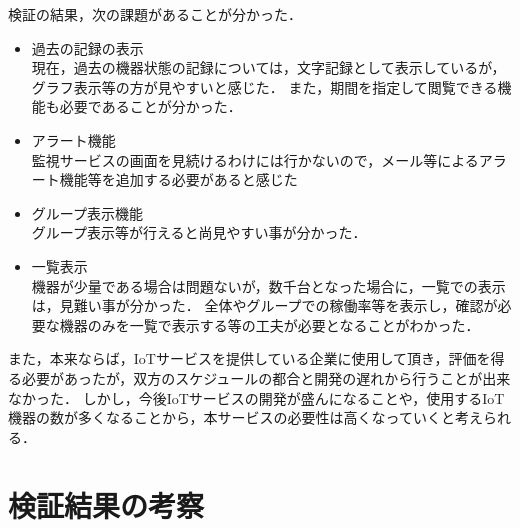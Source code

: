 検証の結果，次の課題があることが分かった．
\begin{itemize}
\item 過去の記録の表示\\
	現在，過去の機器状態の記録については，文字記録として表示しているが，グラフ表示等の方が見やすいと感じた．
	また，期間を指定して閲覧できる機能も必要であることが分かった．
\item アラート機能\\
	監視サービスの画面を見続けるわけには行かないので，メール等によるアラート機能等を追加する必要があると感じた
\item グループ表示機能\\
	グループ表示等が行えると尚見やすい事が分かった．
\item 一覧表示\\
	機器が少量である場合は問題ないが，数千台となった場合に，一覧での表示は，見難い事が分かった．
	全体やグループでの稼働率等を表示し，確認が必要な機器のみを一覧で表示する等の工夫が必要となることがわかった．
\end{itemize}
また，本来ならば，IoTサービスを提供している企業に使用して頂き，評価を得る必要があったが，双方のスケジュールの都合と開発の遅れから行うことが出来なかった．
しかし，今後IoTサービスの開発が盛んになることや，使用するIoT機器の数が多くなることから，本サービスの必要性は高くなっていくと考えられる．

\section{検証結果の考察}


